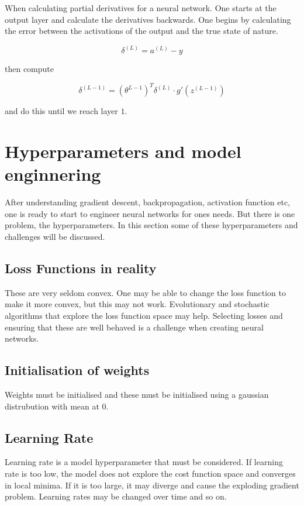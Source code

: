 When calculating partial derivatives for a neural network. One starts at the
output layer and calculate the derivatives backwards. 
One begins by calculating the error between the activations of the output and 
the true state of nature.

\begin{equation*}
    \delta^{(L)} = a^{(L)} - y
\end{equation*}

then compute 

\begin{equation*}
    \delta^{(L-1)} = (\theta^{L-1})^T\delta^{(L)} \cdot g'(z^{(L-1)})
\end{equation*}

and do this until we reach layer $1$.

\section{Hyperparameters and model enginnering}

After understanding gradient descent, backpropagation, activation function etc,
one is ready to start to engineer neural networks for ones needs. But there is 
one problem, the hyperparameters. In this section some of these hyperparameters
and challenges will be discussed.

\subsection{Loss Functions in reality}

These are very seldom convex. One may be able to change the loss function 
to make it more convex, but this may not work. Evolutionary and stochastic
algorithms that explore the loss function space may help. Selecting losses
and ensuring that these are well behaved is a challenge when creating neural
networks.

\subsection{Initialisation of weights}

Weights must be initialised and these must be initialised using a gaussian
distrubution with mean at $0$. 

\subsection{Learning Rate}
Learning rate is a model hyperparameter that must be considered. If learning 
rate is too low, the model does not explore the cost function space and
converges in local minima. If it is too large, it may diverge and cause
the exploding gradient problem. Learning rates may be changed over time
and so on.

